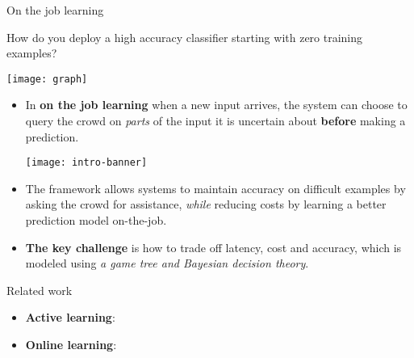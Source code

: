 \begin{block}{On the job learning}
  \begin{center}
  {\large How do you deploy a high accuracy classifier starting with zero training examples?}
  \end{center}

  \begin{center}
  \texttt{[image: graph]}
  \end{center}

  \begin{itemize}
    \item In {\bf on the job learning} when a new input arrives, the system can choose to query the crowd on \emph{parts} of the input it is uncertain about {\bf before} making a prediction. 

  \begin{center}
    \texttt{[image: intro-banner]}
  \end{center}

    \item The framework allows systems to maintain accuracy on difficult examples by asking the crowd for assistance, \emph{while} reducing costs by learning a better prediction model on-the-job.
    \item {\bf The key challenge} is how to trade off latency, cost and
      accuracy, which is modeled using {\em a game tree and Bayesian decision theory}. 
  \end{itemize}

\end{block}

\begin{block}{Related work}
  \begin{itemize}
    \item \textbf{Active learning}:
    \item \textbf{Online learning}:
  \end{itemize}
\end{block}

